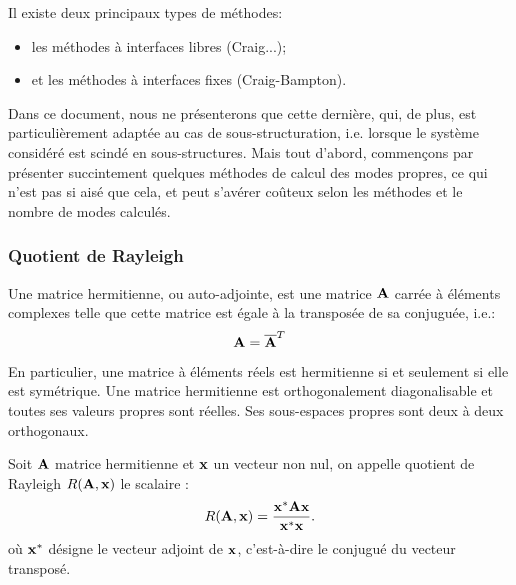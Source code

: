 \medskip
Il existe deux principaux types de méthodes:
\begin{itemize}
   \item les méthodes à interfaces libres (Craig...);
   \item et les méthodes à interfaces fixes (Craig-Bampton).
\end{itemize}
Dans ce document, nous ne présenterons que cette dernière, qui, de plus, 
est particulièrement adaptée au cas de sous-structuration, i.e. lorsque le système considéré est scindé en 
sous-structures.
\medskipvm
Mais tout d'abord, commençons par présenter succintement quelques méthodes de calcul des modes propres, ce qui n'est 
pas si aisé que cela, et peut  s'avérer coûteux selon les méthodes et le nombre de modes calculés.

\medskip
\subsubsection{Quotient de Rayleigh}

\begin{definition}
Une matrice hermitienne, ou auto-adjointe, est une matrice $\MM{A}$ carrée à éléments complexes  telle que 
cette matrice est égale à la transposée de sa conjuguée, i.e.:
\begin{equation}
\MM{A} = \overline{\MM{A}}^T
\end{equation}
\end{definition}
En particulier, une matrice à éléments réels est hermitienne si et seulement si elle est symétrique. 
\medskipvm
Une matrice hermitienne est orthogonalement diagonalisable et toutes ses valeurs propres sont 
réelles. Ses sous-espaces propres sont deux à deux orthogonaux.

\begin{definition}
Soit $\MM{A}$ matrice hermitienne et $\VV{x}$ un vecteur non nul, on appelle quotient de Rayleigh $R(\MM{A},\VV{x})$ le scalaire :
\begin{equation}
    R(\MM{A},\VV{x}) = \frac{\VV{x}^{*} \MM{A} \VV{x}}{\VV{x}^{*}\VV{x}}.
\end{equation}
où $\VV{x}^{*}$ désigne le vecteur adjoint de $\VV{x}$, c'est-à-dire le conjugué du vecteur transposé.
\end{definition}


